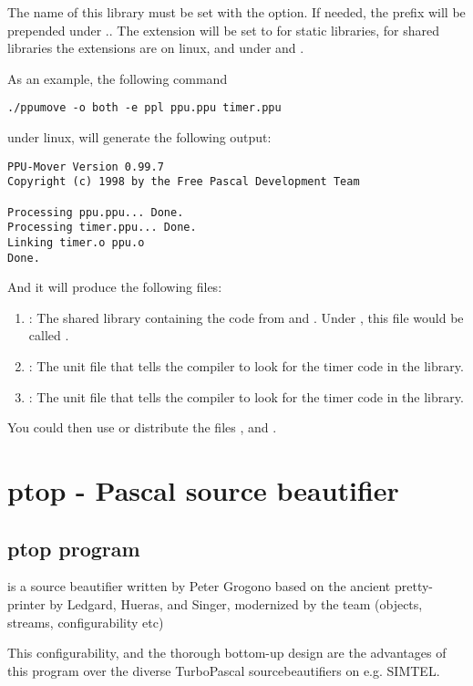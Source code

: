 The name of this library must be set with the  option.
If needed, the prefix  will be prepended under \linux..
The extension will be set to  for static libraries,
for shared libraries the extensions are  on linux, and 
under \windowsnt and \ostwo.

As an example, the following command
\begin{verbatim}
./ppumove -o both -e ppl ppu.ppu timer.ppu
\end{verbatim}
under linux, will generate the following output:
\begin{verbatim}
PPU-Mover Version 0.99.7
Copyright (c) 1998 by the Free Pascal Development Team

Processing ppu.ppu... Done.
Processing timer.ppu... Done.
Linking timer.o ppu.o
Done.
\end{verbatim}
And it will produce the following files:
\begin{enumerate}
\item {} : The shared library containing the code from
 and . Under \windowsnt, this file would be called
.
\item {} : The unit file that tells the \fpc compiler to look
for the timer code in the library.
\item {} : The unit file that tells the \fpc compiler to look
for the timer code in the library.
\end{enumerate}
You could then use or distribute the files , 
and .

\section{ptop - Pascal source beautifier}

\subsection{ptop program}

 is a source beautifier written by Peter Grogono based on the ancient pretty-printer
by Ledgard, Hueras, and Singer, modernized by the \fpc team (objects, streams, configurability etc)

This configurability, and the thorough bottom-up design are the advantages of this program over
the diverse TurboPascal sourcebeautifiers on e.g. SIMTEL.

